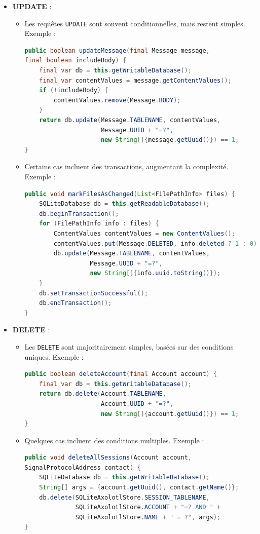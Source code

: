 \documentclass[a4paper,11pt]{article}
\begin{document}
\begin{itemize}
    \item \textbf{UPDATE} :
    \begin{itemize}
        \item Les requêtes \texttt{UPDATE} sont souvent conditionnelles, mais restent simples. Exemple :
        \begin{lstlisting}[language=Java]
public boolean updateMessage(final Message message, 
final boolean includeBody) {
    final var db = this.getWritableDatabase();
    final var contentValues = message.getContentValues();
    if (!includeBody) {
        contentValues.remove(Message.BODY);
    }
    return db.update(Message.TABLENAME, contentValues, 
                     Message.UUID + "=?", 
                     new String[]{message.getUuid()}) == 1;
}
        \end{lstlisting}
        \item Certains cas incluent des transactions, augmentant la complexité. Exemple :
        \begin{lstlisting}[language=Java]
public void markFilesAsChanged(List<FilePathInfo> files) {
    SQLiteDatabase db = this.getReadableDatabase();
    db.beginTransaction();
    for (FilePathInfo info : files) {
        ContentValues contentValues = new ContentValues();
        contentValues.put(Message.DELETED, info.deleted ? 1 : 0);
        db.update(Message.TABLENAME, contentValues, 
                  Message.UUID + "=?", 
                  new String[]{info.uuid.toString()});
    }
    db.setTransactionSuccessful();
    db.endTransaction();
}
        \end{lstlisting}
    \end{itemize}
    
    \item \textbf{DELETE} :
    \begin{itemize}
        \item Les \texttt{DELETE} sont majoritairement simples, basées sur des conditions uniques. Exemple :
        \begin{lstlisting}[language=Java]
public boolean deleteAccount(final Account account) {
    final var db = this.getWritableDatabase();
    return db.delete(Account.TABLENAME, 
                     Account.UUID + "=?", 
                     new String[]{account.getUuid()}) == 1;
}
        \end{lstlisting}
        \item Quelques cas incluent des conditions multiples. Exemple :
        \begin{lstlisting}[language=Java]
public void deleteAllSessions(Account account, 
SignalProtocolAddress contact) {
    SQLiteDatabase db = this.getWritableDatabase();
    String[] args = {account.getUuid(), contact.getName()};
    db.delete(SQLiteAxolotlStore.SESSION_TABLENAME, 
              SQLiteAxolotlStore.ACCOUNT + "=? AND " + 
              SQLiteAxolotlStore.NAME + " = ?", args);
}
        \end{lstlisting}
    \end{itemize}
\end{itemize}
\end{document}
